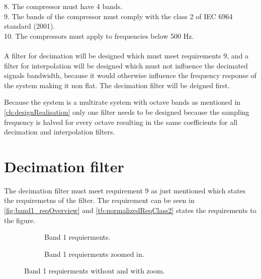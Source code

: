 8. The compressor must have 4 bands. \\
9. The bands of the compressor must comply with the class 2 of IEC 6964 standard (2001). \\
10. The compressors must apply to frequencies below 500 Hz. \\
\\ 
A filter for decimation will be designed which must meet requirements 9, and a filter for interpolation will be designed which must not influence the decimated signals bandwidth, because it would otherwise influence the frequency response of the system making it non flat. The decimation filter will be deigned first.

Because the system is a multirate system with octave bands as mentioned in \autoref{ch:designRealisation} only one filter needs to be designed because the sampling frequency is halved for every octave resulting in the same coefficients for all decimation and interpolation filters.

\section{Decimation filter}
The decimation filter must meet requirement 9 as just mentioned which states the requiremetns of the filter. The requirement can be seen in \autoref{fig:band1_reqOverview} and \autoref{tb:normalizedReqClass2} states the requirements to the figure.

\begin{figure}[H]
\centering
\begin{subfigure}[t]{0.45\textwidth}
	
	\caption{Band 1 requierments.}
	\label{fig:band1_req}
\end{subfigure}
\begin{subfigure}[t]{0.45\textwidth}
	
	\caption{Band 1 requierments zoomed in.}
	\label{fig:band1_reqZoom}
\end{subfigure}
\caption{Band 1 requierments without and with zoom.}
\label{fig:band1_reqOverview}
\end{figure}



